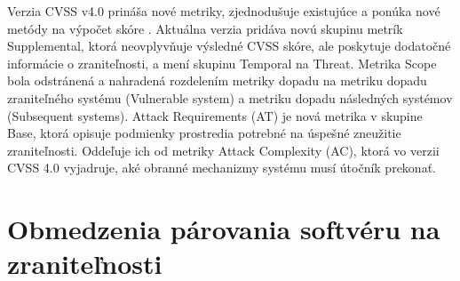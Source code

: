 Verzia CVSS v4.0 prináša nové metriky, zjednodušuje existujúce a ponúka nové metódy na výpočet skóre \cite{cvssComparison2024}.
Aktuálna verzia pridáva novú skupinu metrík Supplemental, ktorá neovplyvňuje výsledné CVSS skóre, ale poskytuje dodatočné informácie o zraniteľnosti, 
a mení skupinu Temporal na Threat.
Metrika Scope bola odstránená a nahradená rozdelením metriky dopadu na metriku dopadu zraniteľného systému (Vulnerable system) 
a metriku dopadu následných systémov (Subsequent systems).
Attack Requirements (AT) je nová metrika v skupine Base, ktorá opisuje podmienky prostredia potrebné na úspešné zneužitie zraniteľnosti. 
Oddeľuje ich od metriky Attack Complexity (AC), ktorá vo verzii CVSS 4.0 vyjadruje, aké obranné mechanizmy systému musí útočník prekonať.


\section{Obmedzenia párovania softvéru na zraniteľnosti}
\label{sec:obmedzeniaParovania}


\label{subsec:hodnoteniePrioritizacia}


